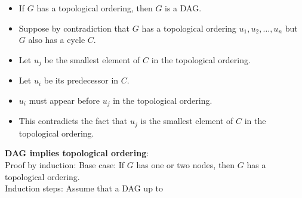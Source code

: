\documentclass[onecolumn]{report}
\begin{document}
\begin{itemize}
    \item If $G$ has a topological ordering, then $G$ is a DAG.
    \item Suppose by contradiction that $G$ has a topological ordering $u_1,u_2,\dots,u_n$ but $G$ also has a cycle $C$.
    \item Let $u_j$ be the smallest element of $C$ in the topological ordering.
    \item Let $u_i$ be its predecessor in $C$.
    \item $u_i$ must appear before $u_j$ in the topological ordering.
    \item This contradicts the fact that $u_j$ is the smallest element of $C$ in the topological ordering.
\end{itemize}

\noindent
\textbf{DAG implies topological ordering}:\\
Proof by induction:
Base case: If $G$ has one or two nodes, then $G$ has a topological ordering.\\
Induction steps: Assume that a DAG up to \\
\end{document}
